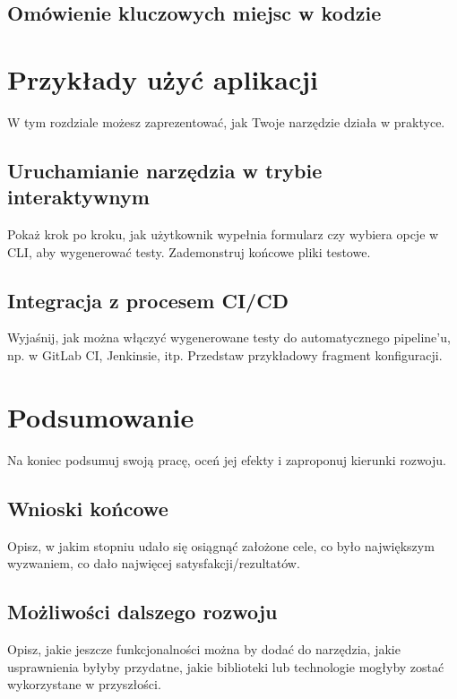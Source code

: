 \documentclass[12pt]{report}
\begin{document}
\section{Omówienie kluczowych miejsc w kodzie}

\chapter{Przykłady użyć aplikacji}
{W tym rozdziale możesz zaprezentować, jak Twoje narzędzie działa w praktyce.}

\section{Uruchamianie narzędzia w trybie interaktywnym}
{Pokaż krok po kroku, jak użytkownik wypełnia formularz czy wybiera opcje w CLI, aby wygenerować testy. Zademonstruj końcowe pliki testowe.}

\section{Integracja z procesem CI/CD}
{Wyjaśnij, jak można włączyć wygenerowane testy do automatycznego pipeline’u, np. w GitLab CI, Jenkinsie, itp. Przedstaw przykładowy fragment konfiguracji.}

\chapter{Podsumowanie}
{Na koniec podsumuj swoją pracę, oceń jej efekty i zaproponuj kierunki rozwoju.}

\section{Wnioski końcowe}
{Opisz, w jakim stopniu udało się osiągnąć założone cele, co było największym wyzwaniem, co dało najwięcej satysfakcji/rezultatów.}

\section{Możliwości dalszego rozwoju}
{Opisz, jakie jeszcze funkcjonalności można by dodać do narzędzia, jakie usprawnienia byłyby przydatne, jakie biblioteki lub technologie mogłyby zostać wykorzystane w przyszłości.}
\end{document}
